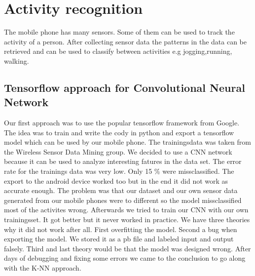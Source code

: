 \documentclass[conference]{IEEEtran}
\begin{document}
\section{Activity recognition}
The mobile phone has many sensors. Some of them can be used to track the activity of a person.  After collecting sensor data the patterns in the data can be retrieved and can be used to classify between activities e.g jogging,running, walking.
\subsection{Tensorflow approach for Convolutional Neural Network}
Our first approach was to use the popular tensorflow framework from Google. The idea was to train and write the cody in python and export a tensorflow model which can be used by our mobile phone. The trainingsdata was taken from the Wireless Sensor Data Mining group\cite{b1}. We decided to use a CNN network because it can be used to analyze interesting fatures in the data set. The error rate for the trainings data was very low. Only 15 \% were missclassified. The export to the android device worked too but in the end it did not work as accurate enough. The problem was that our dataset and our own sensor data generated from our mobile phones were to different so the model missclassified most of the activites wrong. Afterwards we tried to train our CNN with our own trainingsset. It got better but it never worked in practice. We have three theories why it did not work after all. First overfitting the model. Second a bug when exporting the model. We stored it as a pb file and labeled input and output falsely. Third and last theory would be that the model was designed wrong. After days of debugging and fixing some errors we came to the conclusion to go along with the K-NN approach\cite{b2}.
\end{document}
